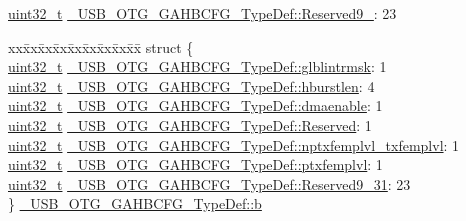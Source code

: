 \begin{DoxyCompactItemize}
\item 
\hyperlink{stdint_8h_a435d1572bf3f880d55459d9805097f62}{uint32\-\_\-t} \hyperlink{group___u_s_b___o_t_g___d_r_i_v_e_r_ga5a325042322da6633f76b2a0c489940b}{\-\_\-\-U\-S\-B\-\_\-\-O\-T\-G\-\_\-\-G\-A\-H\-B\-C\-F\-G\-\_\-\-Type\-Def\-::\-Reserved9\-\_}\-: 23
\item 
\begin{tabbing}
xx\=xx\=xx\=xx\=xx\=xx\=xx\=xx\=xx\=\kill
struct \{\\
\>\hyperlink{stdint_8h_a435d1572bf3f880d55459d9805097f62}{uint32\_t} \hyperlink{group___u_s_b___o_t_g___d_r_i_v_e_r_ga6d5b18dc5c45a9377ff26ae705e237f0}{\_USB\_OTG\_GAHBCFG\_TypeDef::glblintrmsk}: 1\\
\>\hyperlink{stdint_8h_a435d1572bf3f880d55459d9805097f62}{uint32\_t} \hyperlink{group___u_s_b___o_t_g___d_r_i_v_e_r_gaef76ba04426956f90a8f6f25dd493051}{\_USB\_OTG\_GAHBCFG\_TypeDef::hburstlen}: 4\\
\>\hyperlink{stdint_8h_a435d1572bf3f880d55459d9805097f62}{uint32\_t} \hyperlink{group___u_s_b___o_t_g___d_r_i_v_e_r_gaa752eec03f809fffd6f0f46f34b5752d}{\_USB\_OTG\_GAHBCFG\_TypeDef::dmaenable}: 1\\
\>\hyperlink{stdint_8h_a435d1572bf3f880d55459d9805097f62}{uint32\_t} \hyperlink{group___u_s_b___o_t_g___d_r_i_v_e_r_ga44156423025612e25b7e6c0f473b5a50}{\_USB\_OTG\_GAHBCFG\_TypeDef::Reserved}: 1\\
\>\hyperlink{stdint_8h_a435d1572bf3f880d55459d9805097f62}{uint32\_t} \hyperlink{group___u_s_b___o_t_g___d_r_i_v_e_r_gae2801f85844ee69bae3fcb3a2e9d201e}{\_USB\_OTG\_GAHBCFG\_TypeDef::nptxfemplvl\_txfemplvl}: 1\\
\>\hyperlink{stdint_8h_a435d1572bf3f880d55459d9805097f62}{uint32\_t} \hyperlink{group___u_s_b___o_t_g___d_r_i_v_e_r_ga8aef75b0d6a052f8e4e305e99f9dca16}{\_USB\_OTG\_GAHBCFG\_TypeDef::ptxfemplvl}: 1\\
\>\hyperlink{stdint_8h_a435d1572bf3f880d55459d9805097f62}{uint32\_t} \hyperlink{group___u_s_b___o_t_g___d_r_i_v_e_r_ga5a325042322da6633f76b2a0c489940b}{\_USB\_OTG\_GAHBCFG\_TypeDef::Reserved9\_31}: 23\\
\} \hyperlink{group___u_s_b___o_t_g___d_r_i_v_e_r_ga8ae85bd362af6e19047437743ff22b55}{\_USB\_OTG\_GAHBCFG\_TypeDef::b}\\


\end{tabbing}
\end{DoxyCompactItemize}
